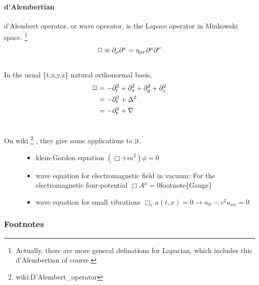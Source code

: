 \documentclass[letterpaper,10pt,english]{sphinxmanual}
\begin{document}
\paragraph{d'Alembertian}
\label{relativity/SpecialRelativity:d-alembertian}
d'Alembert operator, or wave operator, is the Lapace operator in Minkowski space. \footnote{
Actually, there are more general definations for Lapacian, which includes this d'Alembertian of course.
}
\begin{gather}
\begin{split}\Box \equiv \partial _ \mu\partial^\nu = \eta _{\mu\nu}\partial^\mu \partial^\nu\end{split}\notag\\\begin{split}\end{split}\notag
\end{gather}
In the usual \{t,x,y,z\} natural orthonormal basis,
\begin{gather}
\begin{split}\Box & = -\partial_t^2+\partial_x^2+\partial_y^2+\partial_z^2 \\
& = -\partial_t^2+\Delta^2 \\
& = -\partial_t^2+\nabla\end{split}\notag\\\begin{split}\end{split}\notag
\end{gather}\begin{description}
\item[{On wiki \footnote{
wiki:D'Alembert\_operator
} , they give some applications to it.}] \leavevmode\begin{itemize}
\item {} 
klein-Gordon equation
$(\Box+m^2)\phi=0$

\item {} 
wave equation for electromagnetic field in vacuum:
For the electromagnetic four-potential $\Box A^\mu=0$footnote\{Gauge\}

\item {} 
wave equation for small vibrations
$\Box_c u(t,x)=0\rightarrow u_{tt}-c^2 u_{xx}=0$

\end{itemize}

\end{description}


\subsubsection{Footnotes}
\label{relativity/SpecialRelativity:footnotes}
\end{document}

